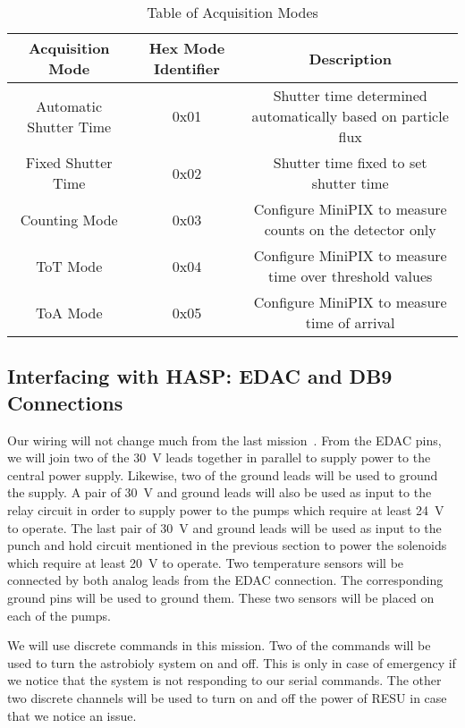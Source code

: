 \begin{table}[!ht]
\centering
\caption{Table of Acquisition Modes} 
\label{tab:Acq-Commands}
\bigskip
\begin{tabular}{|c|c|c|}
\hline
\multicolumn{1}{|c|}{\bfseries Acquisition Mode} & \multicolumn{1}{c|}{\bfseries Hex Mode Identifier} & \multicolumn{1}{c|}{\bfseries Description}\\
\hline
    Automatic Shutter Time	& 0x01   & Shutter time determined automatically based on particle flux   \\ \hline %
    Fixed Shutter Time    	& 0x02 	 & Shutter time fixed to set shutter time 	     		  \\ \hline
    Counting Mode    		& 0x03 	 & Configure MiniPIX to measure counts on the detector only 	  \\ \hline
    ToT Mode			& 0x04	 & Configure MiniPIX to measure time over threshold values	  \\ \hline
    ToA Mode			& 0x05 	 & Configure MiniPIX to measure time of arrival 	     	  \\ \hline
\end{tabular}
\medskip
\end{table}


\subsection{Interfacing with HASP: EDAC and DB9 Connections}

Our wiring will not change much from the last mission~\cite{SORA}.  From the EDAC pins, we will join two of the \SI{30}{\volt} leads together in parallel to supply power to the central power supply.  Likewise, two of the ground leads will be used to ground the supply.  A pair of \SI{30}{\volt} and ground leads will also be used as input to the relay circuit in order to supply power to the pumps which require at least \SI{24}{\volt} to operate.  The last pair of \SI{30}{\volt} and ground leads will be used as input to the punch and hold circuit mentioned in the previous section to power the solenoids which require at least \SI{20}{\volt} to operate.  Two temperature sensors will be connected by both analog leads from the EDAC connection.  The corresponding ground pins will be used to ground them.  These two sensors will be placed on each of the pumps.

We will use discrete commands in this mission.  Two of the commands will be used to turn the astrobioly system on and off.  This is only in case of emergency if we notice that the system is not responding to our serial commands.  The other two discrete channels will be used to turn on and off the power of RESU in case that we notice an issue.

